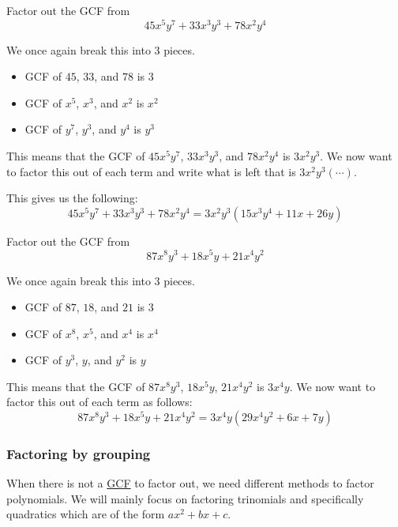 \begin{exercise}
Factor out the GCF from
\[
45x^5y^7+33x^3y^3+78x^2y^4
\]
\end{exercise}
\begin{solution}[2in]
We once again break this into 3 pieces.
\begin{itemize}
\item GCF of $45$, $33$, and $78$ is \underline{\phantom{=}$3$\phantom{=}}
\item GCF of $x^5$, $x^3$, and $x^2$ is \underline{\phantom{=}$x^2$\phantom{=}}
\item GCF of $y^7$, $y^3$, and $y^4$ is \underline{\phantom{=}$y^3$\phantom{=}}
\end{itemize}
This means that the GCF of $45x^5y^7$, $33x^3y^3$, and $78x^2y^4$ is $3x^2y^3$. We now
want to factor this out of each term and write what is left that is $3x^2y^3(\cdots)$.

This gives us the following:
\[
45x^5y^7+33x^3y^3+78x^2y^4=3x^2y^3(15x^3y^4+11x+26y)
\]
\end{solution}
\vspace{0.5em}

\begin{exercise}
Factor out the GCF from
\[
87x^8y^3+18x^5y+21x^4y^2
\]
\end{exercise}
\begin{solution}[2in]
We once again break this into 3 pieces.
\begin{itemize}
\item GCF of $87$, $18$, and $21$ is \underline{\phantom{=}$3$\phantom{=}}
\item GCF of $x^8$, $x^5$, and $x^4$ is \underline{\phantom{=}$x^4$\phantom{=}}
\item GCF of $y^3$, $y$, and $y^2$ is \underline{\phantom{=}$y$\phantom{=}}
\end{itemize}
This means that the GCF of $87x^8y^3$, $18x^5y$, $21x^4y^2$ is $3x^4y$. We now
want to factor this out of each term as follows:
\[
87x^8y^3+18x^5y+21x^4y^2=3x^4y(29x^4y^2+6x+7y)
\]
\end{solution}

\subsubsection{Factoring by grouping}
When there is not a \hyperref[def: GCF]{GCF} to factor out, we need different methods to
factor polynomials. We will mainly focus on factoring trinomials and specifically
quadratics which are of the form $ax^2+bx+c$.

